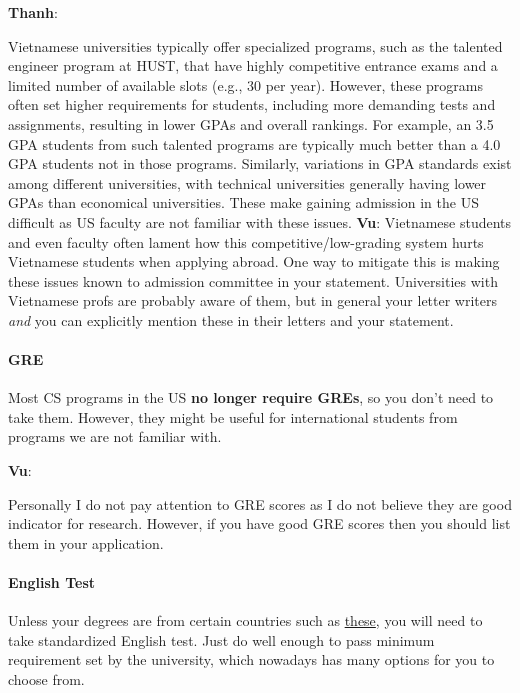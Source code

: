 \documentclass[11pt]{article}
\newenvironment{commentbox}[1][]{
\small
    \begin{cbox}
    \textbf{#1}: 
 }{
   \end{cbox}
}
\begin{document}
\begin{commentbox}[Thanh]
Vietnamese universities typically offer specialized programs, such as the talented engineer program at HUST, that have highly competitive entrance exams and a limited number of available slots (e.g., 30 per year). However, these programs often set higher requirements for students, including more demanding tests and assignments, resulting in lower GPAs and overall rankings. For example, an 3.5 GPA students from such talented programs are typically much better than a 4.0 GPA students not in those programs.  Similarly, variations in GPA standards exist among different universities, with technical universities generally having lower GPAs than economical universities. These make gaining admission in the US difficult as US faculty are not familiar with these issues.
\tcblower
\textbf{Vu}: Vietnamese students and even faculty often lament how this competitive/low-grading system hurts Vietnamese students when applying abroad. One way to mitigate this is making these issues known to admission committee in your statement.  Universities with Vietnamese profs are probably aware of them, but in general your letter writers \emph{and} you can explicitly mention these in their letters and your statement.
\end{commentbox}

\paragraph{GRE} Most CS programs in the US \textbf{no longer require GREs}, so you don't need to take them. However, they might be useful for international students from programs we are not familiar with. 

\begin{commentbox}[Vu]
Personally I do not pay attention to GRE scores as I do not believe they are good indicator for research. However, if you have good GRE scores then you should list them in your application.
\end{commentbox}

\paragraph{English Test} Unless your degrees are from certain countries such as \href{https://github.com/dynaroars/dynaroars.github.io/wiki/About-GMU#standard-tests-waiver-eligible-countries}{these}, you will need to
take standardized English test. Just do well enough to pass minimum requirement set by the university, which nowadays has many options for you to choose from.
\end{document}
